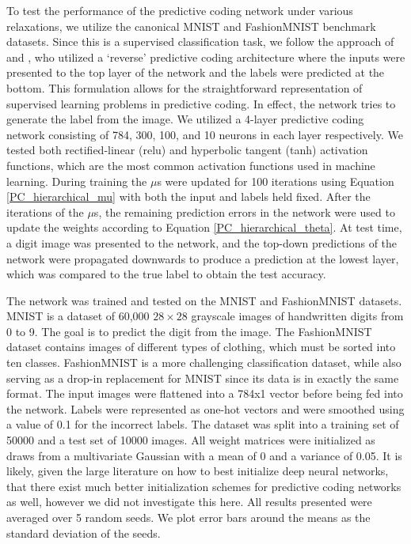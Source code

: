 To test the performance of the predictive coding network under various relaxations, we utilize the canonical MNIST and FashionMNIST \citep{xiao2017fashion} benchmark datasets. Since this is a supervised classification task, we follow the approach of \citet{whittington2017approximation} and \citet{millidge2020predictive}, who utilized a `reverse' predictive coding architecture where the inputs were presented to the top layer of the network and the labels were predicted at the bottom. This formulation allows for the straightforward representation of supervised learning problems in predictive coding. In effect, the network tries to generate the label from the image. We utilized a 4-layer predictive coding network consisting of 784, 300, 100, and 10 neurons in each layer respectively. We tested both rectified-linear (relu) and hyperbolic tangent (tanh) activation functions, which are the most common activation functions used in machine learning.  During training the $\mu$s were updated for 100 iterations using Equation \ref{PC_hierarchical_mu} with both the input and labels held fixed. After the iterations of the $\mu$s, the remaining prediction errors in the network were used to update the weights according to Equation \ref{PC_hierarchical_theta}. 
At test time, a digit image was presented to the network, and the top-down predictions of the network were propagated downwards to produce a prediction at the lowest layer, which was compared to the true label to obtain the test accuracy. 

The network was trained and tested on the MNIST and FashionMNIST datasets. MNIST is a dataset of 60,000 $28 \times 28$ grayscale images of handwritten digits from 0 to 9. The goal is to predict the digit from the image. The FashionMNIST dataset contains images of different types of clothing, which must be sorted into ten classes. FashionMNIST is a more challenging classification dataset, while also serving as a drop-in replacement for MNIST since its data is in exactly the same format. The input images were flattened into a 784x1 vector before being fed into the network. Labels were represented as one-hot vectors and were smoothed using a value of 0.1 for the incorrect labels. The dataset was split into a training set of 50000 and a test set of 10000 images. All weight matrices were initialized as draws from a multivariate Gaussian with a mean of 0 and a variance of 0.05. It is likely, given the large literature on how to best initialize deep neural networks, that there exist much better initialization schemes for predictive coding networks as well, however we did not investigate this here. All results presented were averaged over 5 random seeds. We plot error bars around the means as the standard deviation of the seeds.

